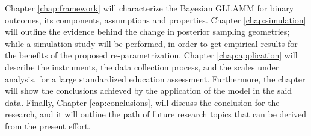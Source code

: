 Chapter \ref{chap:framework} will characterize the Bayesian GLLAMM for binary outcomes, its components, assumptions and properties. Chapter \ref{chap:simulation} will outline the evidence behind the change in posterior sampling geometries; while a simulation study will be performed, in order to get empirical results for the benefits of the proposed re-parametrization. Chapter \ref{chap:application} will describe the instruments, the data collection process, and the scales  under analysis, for a large standardized education assessment. Furthermore, the chapter will show the conclusions achieved by the application of the model in the said data. Finally, Chapter \ref{cap:conclusions}, will discuss the conclusion for the research, and it will outline the path of future research topics that can be derived from the present effort.

